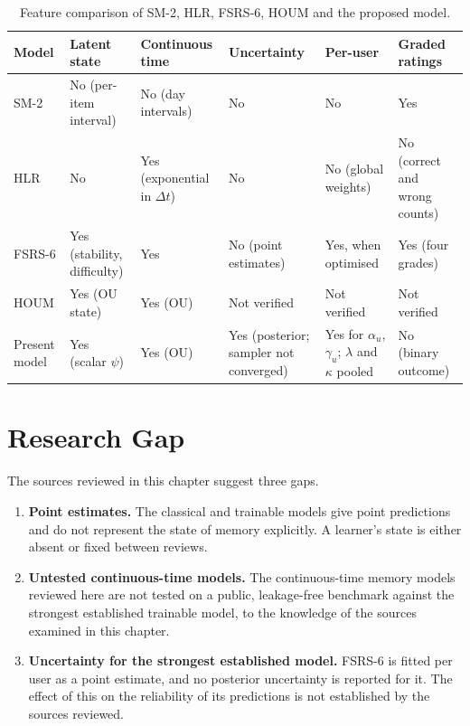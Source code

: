 \begin{table}[htbp]
  \centering
  \footnotesize\setlength{\tabcolsep}{4pt}
  \caption{Feature comparison of SM-2, HLR, FSRS-6, HOUM and the proposed model.}
  \label{tab:feature_comparison}
  \footnotesize
  \begin{tabular}{@{}>{\raggedright\arraybackslash}p{1.9cm}>{\raggedright\arraybackslash}p{2.15cm}>{\raggedright\arraybackslash}p{2.15cm}>{\raggedright\arraybackslash}p{2.15cm}>{\raggedright\arraybackslash}p{2.15cm}>{\raggedright\arraybackslash}p{2.15cm}@{}}
    \toprule
    Model & Latent state & Continuous time & Uncertainty & Per-user & Graded ratings \\
    \midrule
    SM-2 & No (per-item interval) & No (day intervals) & No & No & Yes \\
    HLR & No & Yes (exponential in $\Delta t$) & No & No (global weights) & No (correct and wrong counts) \\
    FSRS-6 & Yes (stability, difficulty) & Yes & No (point estimates) & Yes, when optimised & Yes (four grades) \\
    HOUM & Yes (OU state) & Yes (OU) & Not verified & Not verified & Not verified \\
    Present model & Yes (scalar $\psi$) & Yes (OU) & Yes (posterior; sampler not converged) & Yes for $\alpha_u$, $\gamma_u$; $\lambda$ and $\kappa$ pooled & No (binary outcome) \\
    \bottomrule
  \end{tabular}
\end{table}

\section{Research Gap}
\label{sec:lit-gap}

The sources reviewed in this chapter suggest three gaps.

\begin{enumerate}
  \item \textbf{Point estimates.} The classical and trainable models give point predictions and do not
    represent the state of memory explicitly. A learner's state is either absent or fixed between reviews.
  \item \textbf{Untested continuous-time models.} The continuous-time memory models reviewed here are not
    tested on a public, leakage-free benchmark against the strongest established trainable model, to the knowledge of the
    sources examined in this chapter.
  \item \textbf{Uncertainty for the strongest established model.} FSRS-6 is fitted per user as a point estimate, and no
    posterior uncertainty is reported for it. The effect of this on the reliability of its predictions is not
    established by the sources reviewed.
\end{enumerate}

